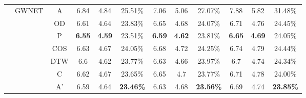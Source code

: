 \begin{table}[t!]
\begin{center}
{\begin{tabular}{c|c|c|ccc|ccc|ccc}
                \cline{2-12}
                                               & \multirow{7}{*}{GWNET} & A     & 6.84                                  & 4.84                                  & 25.51\%                               & 7.06          & 5.06          & 27.07\%          & 7.88          & 5.82          & 31.48\%          \\
                                               &                        & OD    & 6.61                                  & 4.64                                  & 23.83\%                               & 6.65          & 4.68          & 24.07\%          & 6.71          & 4.76          & 24.45\%          \\
                                               &                        & P     & \textbf{6.55}                         & \textbf{4.59}                         & 23.51\%                               & \textbf{6.59} & \textbf{4.62} & 23.81\%          & \textbf{6.65} & \textbf{4.69} & 24.05\%          \\
                                               &                        & COS   & 6.63                                  & 4.67                                  & 24.05\%                               & 6.68          & 4.72          & 24.25\%          & 6.74          & 4.79          & 24.44\%          \\
                                               &                        & DTW   & 6.6                                   & 4.62                                  & 23.77\%                               & 6.63          & 4.66          & 23.97\%          & 6.7           & 4.74          & 24.34\%          \\
                                               &                        & C     & 6.62                                  & 4.67                                  & 23.65\%                               & 6.65          & 4.7           & 23.77\%          & 6.71          & 4.78          & 24.00\%          \\
                                               &                        & A'    & 6.59                                  & 4.64                                  & \textbf{23.46\%}                      & 6.63          & 4.68          & \textbf{23.56\%} & 6.69          & 4.74          & \textbf{23.85\%} \\
                \bottomrule
            \end{tabular}
        }
    \end{center}
\end{table}

